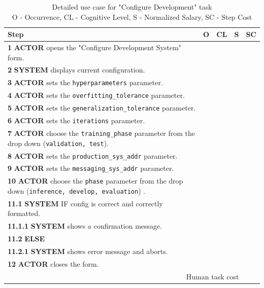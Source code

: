 \begin{table}[H]
    \centering
    \begin{tabularx}{\textwidth}{|X|c|c|c|c|}
    \hline
    \textbf{Step} & \textbf{O} & \textbf{CL} & \textbf{S} & \textbf{SC} \\
    \hline
    \textbf{1} \textbf{ACTOR} opens the "Configure Development System" form. & & & & \\
    \hline
    \textbf{2} \textbf{SYSTEM} displays current configuration. & & & & \\
    \hline
    \textbf{3} \textbf{ACTOR} sets the \texttt{hyperparameters} parameter. & & & & \\
    \hline
    \textbf{4} \textbf{ACTOR} sets the \texttt{overfitting\_tolerance} parameter. & & & & \\
    \hline
    \textbf{5} \textbf{ACTOR} sets the \texttt{generalization\_tolerance} parameter. & & & & \\
    \hline
    \textbf{6} \textbf{ACTOR} sets the \texttt{iterations} parameter. & & & & \\
    \hline
    \textbf{7} \textbf{ACTOR} choose the \texttt{training\_phase} parameter from the drop down (\texttt{validation, test}). & & & & \\
    \hline
    \textbf{8} \textbf{ACTOR} sets the \texttt{production\_sys\_addr} parameter. & & & & \\
    \hline
    \textbf{9} \textbf{ACTOR} sets the \texttt{messaging\_sys\_addr} parameter. & & & & \\
    \hline
    \textbf{10} \textbf{ACTOR} choose the \texttt{phase} parameter from the drop down (\texttt{inference, develop, evaluation}) . & & & & \\
    \hline
    \textbf{11.1} \textbf{SYSTEM} IF config is correct and correctly formatted. & & & & \\
    \hline
    \textbf{11.1.1} \textbf{SYSTEM} shows a confirmation message. & & & & \\
    \hline
    \textbf{11.2} \textbf{ELSE} & & & & \\
    \hline
    \textbf{11.2.1} \textbf{SYSTEM} shows error message and aborts. & & & & \\
    \hline
    \textbf{12} \textbf{ACTOR} closes the form. & & & & \\
    \hline
    \multicolumn{4}{|r|}{Human task cost} & \\
    \hline
    \end{tabularx}
    \caption{Detailed use case for "Configure Development" task\\ 
    O - Occurrence, CL - Cognitive Level, S - Normalized Salary, SC - Step Cost}
    \label{table:configure_development_system}
    \end{table}
